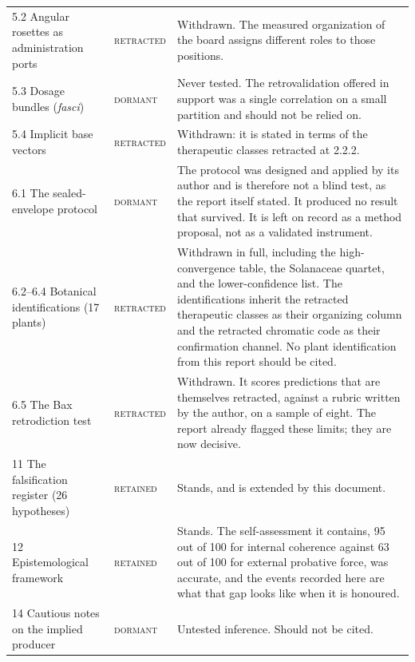 \documentclass[11pt,a4paper]{article}
\newcommand{\keep}{\textsc{retained}}
\newcommand{\retract}{\textcolor{red!65!black}{\textsc{retracted}}}
\newcommand{\dormant}{\textsc{dormant}}
\begin{document}
\begin{longtable}{@{}p{4.9cm}p{2.4cm}p{7.6cm}@{}}
5.2 Angular rosettes as administration ports & \retract{} &
Withdrawn. The measured organization of the board assigns different roles to those positions. \\
\addlinespace

5.3 Dosage bundles (\textit{fasci}) & \dormant{} &
Never tested. The retrovalidation offered in support was a single correlation on a small
partition and should not be relied on. \\
\addlinespace

5.4 Implicit base vectors & \retract{} &
Withdrawn: it is stated in terms of the therapeutic classes retracted at 2.2.2. \\
\addlinespace

6.1 The sealed-envelope protocol & \dormant{} &
The protocol was designed and applied by its author and is therefore not a blind test, as the
report itself stated. It produced no result that survived. It is left on record as a method
proposal, not as a validated instrument. \\
\addlinespace

6.2--6.4 Botanical identifications (17 plants) & \retract{} &
Withdrawn in full, including the high-convergence table, the Solanaceae quartet, and the
lower-confidence list. The identifications inherit the retracted therapeutic classes as their
organizing column and the retracted chromatic code as their confirmation channel. No plant
identification from this report should be cited. \\
\addlinespace

6.5 The Bax retrodiction test & \retract{} &
Withdrawn. It scores predictions that are themselves retracted, against a rubric written by the
author, on a sample of eight. The report already flagged these limits; they are now decisive. \\
\addlinespace

11 The falsification register (26 hypotheses) & \keep{} &
Stands, and is extended by this document. \\
\addlinespace

12 Epistemological framework & \keep{} &
Stands. The self-assessment it contains, 95 out of 100 for internal coherence against 63 out of 100
for external probative force, was accurate, and the events recorded here are what that gap looks
like when it is honoured. \\
\addlinespace

14 Cautious notes on the implied producer & \dormant{} &
Untested inference. Should not be cited. \\
\end{longtable}
\end{document}
